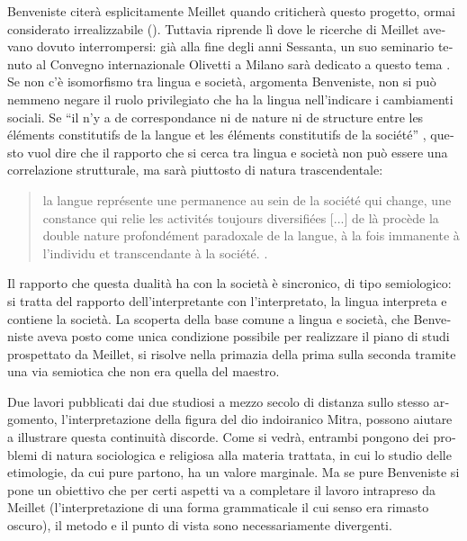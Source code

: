 \documentclass[french,output=paper,colorlinks,citecolor=brown]{../langscibook}
\begin{document}
\begin{otherlanguage}{italian}
Benveniste citerà esplicitamente Meillet quando criticherà questo progetto, ormai considerato irrealizzabile (\citealt[14--15]{Benveniste1966}). Tuttavia riprende lì dove le ricerche di Meillet avevano dovuto interrompersi: già alla fine degli anni Sessanta, un suo seminario tenuto al Convegno internazionale Olivetti a Milano sarà dedicato a questo tema \citep{Benveniste1974}. Se non c’è isomorfismo tra lingua e società, argomenta Benveniste, non si può nemmeno negare il ruolo privilegiato che ha la lingua nell’indicare i cambiamenti sociali. Se “il n’y a de correspondance ni de nature ni de structure entre les éléments constitutifs de la langue et les éléments constitutifs de la société” \citep[93]{Benveniste1974}, questo vuol dire che il rapporto che si cerca tra lingua e società non può essere una correlazione strutturale, ma sarà piuttosto di natura trascendentale:

\begin{quote}
    la langue représente une permanence au sein de la société qui change, une constance qui relie les activités toujours diversifiées [...] de là procède la double nature profondément paradoxale de la langue, à la fois immanente à l’individu et transcendante à la société. \citep[65]{Benveniste1974}.
\end{quote}

Il rapporto che questa dualità ha con la società è sincronico, di tipo semiologico: si tratta del rapporto dell’interpretante con l’interpretato, la lingua interpreta e contiene la società. La scoperta della base comune a lingua e società, che Benveniste aveva posto come unica condizione possibile per realizzare il piano di studi prospettato da Meillet, si risolve nella primazia della prima sulla seconda tramite una via semiotica che non era quella del maestro.\footnotemark{}

Due lavori pubblicati dai due studiosi a mezzo secolo di distanza sullo stesso argomento, l’interpretazione della figura del dio indoiranico Mitra, possono aiutare a illustrare questa continuità discorde. Come si vedrà, entrambi pongono dei problemi di natura sociologica e religiosa alla materia trattata, in cui lo studio delle etimologie, da cui pure partono, ha un valore marginale. Ma se pure Benveniste si pone un obiettivo che per certi aspetti va a completare il lavoro intrapreso da Meillet (l’interpretazione di una forma grammaticale il cui senso era rimasto oscuro), il metodo e il punto di vista sono necessariamente divergenti.


\end{otherlanguage}
\end{document}
